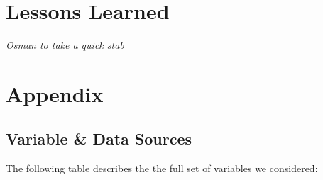 \documentclass[]{article}
\begin{document}
\section{Lessons Learned}\label{lessons-learned}

\emph{Osman to take a quick stab}

\newpage 

\section{Appendix}\label{appendix}

\subsection{Variable \& Data Sources}\label{variable-data-sources}

The following table describes the the full set of variables we
considered:
\end{document}
